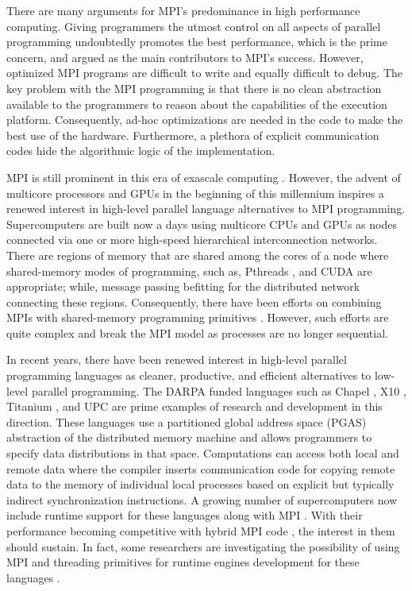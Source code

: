 \documentclass[ASNA,twocolumn]{USG} %
\begin{document}
{There are many arguments for MPI's predominance in high performance computing. Giving programmers the utmost control on all aspects of parallel programming undoubtedly promotes the best performance, which is the prime concern, and argued as the main contributors to MPI's success. However, optimized MPI programs are difficult to write and equally difficult to debug. The key problem with the MPI programming is that there is no clean abstraction available to the programmers to reason about the capabilities of the execution platform. Consequently, ad-hoc optimizations are needed in the code to make the best use of the hardware. Furthermore, a plethora of explicit communication codes hide the algorithmic logic of the implementation.
	
MPI is still prominent in this era of exascale computing \citep{https://doi.org/10.1002/cpe.4851}. However, the advent of multicore processors and GPUs in the beginning of this millennium inspires a renewed interest in high-level parallel language alternatives to MPI programming. Supercomputers are built now a days using multicore CPUs and GPUs as nodes connected via one or more high-speed hierarchical interconnection networks. There are regions of memory that are shared among the cores of a node where shared-memory modes of programming, such as, Pthreads \citep{10.5555/263953}, and CUDA \citep{10.1145/1365490.1365500} are appropriate; while, message passing befitting for the distributed network connecting these regions. Consequently, there have been efforts on combining MPIs with shared-memory programming primitives \citep{YANG2011266} \citep{doi:10.2514/6.2010-522}\citep{10.1007/978-3-540-88436-1_36}. However, such efforts are quite complex and break the MPI model as processes are no longer sequential.     
	
In recent years, there have been renewed interest in high-level parallel programming languages as cleaner, productive, and efficient alternatives to low-level parallel programming. The DARPA funded languages such as Chapel \citep{doi:10.1177/1094342007078442}, X10 \citep{10.1145/1229428.1229483}, Titanium \citep{titanium}, and UPC \citep{10.1145/1188455.1188483} are prime examples of research and development in this direction. These languages use a partitioned global address space (PGAS) abstraction \citep{Yelick:2007:PPU:1278177.1278183} of the distributed memory machine and allows programmers to specify data distributions in that space. Computations can access both local and remote data where the compiler inserts communication code for copying remote data to the memory of individual local processes based on explicit but typically indirect synchronization instructions. A growing number of supercomputers now include runtime support for these languages along with MPI \citep{10.1145/2020373.2020378} \citep{5161076}. With their performance becoming competitive with hybrid MPI code \citep{Chamberlain2018ChapelCO}, the interest in them should sustain. In fact, some researchers are investigating the possibility of using MPI and threading primitives for runtime engines development for these languages \citep{1613273}.
	
}
\end{document}
